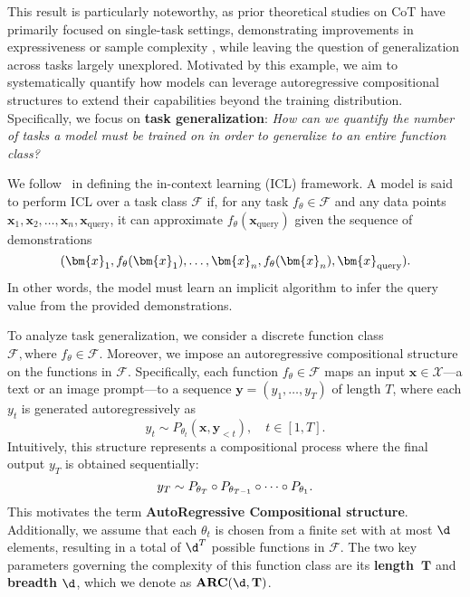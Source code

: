 This result is particularly noteworthy, as prior theoretical studies on CoT have primarily focused on single-task settings, demonstrating improvements in expressiveness \cite{feng2023towards, li2024chain} or sample complexity \cite{wen2024sparse, kim2025transformers}, while leaving the question of generalization across tasks largely unexplored. Motivated by this example, we aim to systematically quantify how models can leverage autoregressive compositional structures to extend their capabilities beyond the training distribution. Specifically, we focus on \textbf{task generalization}: \textit{How can we quantify the number of tasks a model must be trained on in order to generalize to an entire function class?}




We follow~\cite{garg2022can} in defining the in-context learning (ICL) framework. A model is said to perform ICL over a task class \(\mathcal{F}\) if, for any task \( f_{\theta} \in \mathcal{F} \) and any data points \( \bm{x}_1, \bm{x}_2, \dots, \bm{x}_n, \bm{x}_{\mathrm{query}} \), it can approximate \( f_{\theta}(\bm{x}_{\mathrm{query}}) \) given the sequence of demonstrations  
\[
\vspace{-1mm}
(\bm{x}_1, f_{\theta}(\bm{x}_1), \dots, \bm{x}_n, f_{\theta}(\bm{x}_n), \bm{x}_{\mathrm{query}}).
\]
In other words, the model must learn an implicit algorithm to infer the query value from the provided demonstrations.  

To analyze task generalization, we consider a discrete function class  \(\mathcal{F}, \text{where } f_\theta \in \mathcal{F}.\) Moreover, we impose an autoregressive compositional structure on the functions in \(\mathcal{F}\). Specifically, each function \( f_{\theta} \in \mathcal{F} \) maps an input \( \bm{x} \in \mathcal{X} \)---a text or an image prompt---to a sequence \( \bm{y} = (y_1, \dots, y_T) \) of length \( T \), where each \( y_t \) is generated autoregressively as 
\[
y_t \sim P_{\theta_t}(\bm x, \bm{y}_{<t}), \quad t \in [1,T].
\]
Intuitively, this structure represents a compositional process where the final output \( y_T \) is obtained sequentially:
\[
\vspace{-1mm}
y_T \sim P_{\theta_T} \circ P_{\theta_{T-1}} \circ \cdots \circ P_{\theta_1}.
\]
This motivates the term \textbf{AutoRegressive Compositional structure}. Additionally, we assume that each \(\theta_t\) is chosen from a finite set with at most \( \d \) elements, resulting in a total of \( \d^T \) possible functions in \(\mathcal{F}\). The two key parameters governing the complexity of this function class are its \textbf{length~\( \mathbf{T} \)} and \textbf{breadth \( \mathbf{\d} \)}, which we denote as \(\mathbf{ARC(\d, T)}\).  







